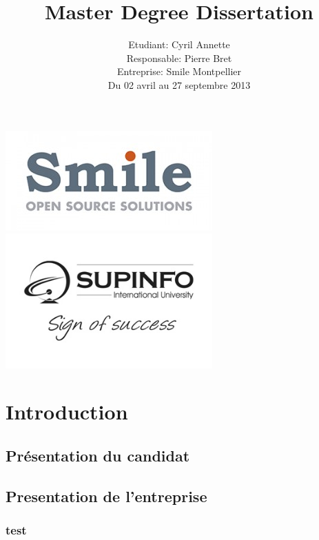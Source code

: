 \documentclass[12pt,a4paper,article]{memoir} %
\title{Master Degree Dissertation}
\author{Etudiant: Cyril Annette\\
Responsable: Pierre Bret\\
Entreprise: Smile Montpellier\\
Du 02 avril au 27 septembre 2013\\
}
\date{} %
\begin{document}
\maketitle
\begin{center}
	\includegraphics[width=300px]{smile.jpg}
	\includegraphics[width=300px]{supinfo.jpg}
\end{center}

\newpage
\tableofcontents* %
\newpage

\chapter{Introduction}
\section{Présentation du candidat}

\paragraph{} \lipsum

\section{Presentation de l'entreprise}

\paragraph{} \lipsum

\subsection{test}
\end{document}
